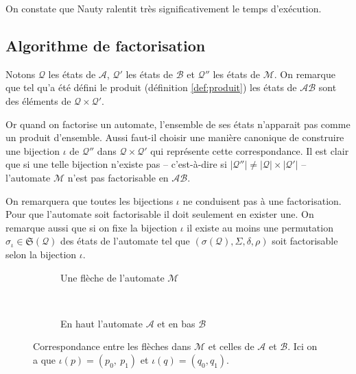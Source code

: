 \documentclass[11pt,a4paper]{article}
\begin{document}
On constate que Nauty ralentit très significativement le temps d'exécution.

\newpage
\subsection{Algorithme de factorisation\label{sec:facto}}

  Notons $\mathcal{Q}$ les états de $\mathcal{A}$, $\mathcal{Q'}$ les états de $\mathcal{B}$ et $\mathcal{Q''}$ les états de $\mathcal{M}$. On remarque que tel qu'a été défini le produit (définition \ref{def:produit}) les états de $\mathcal{AB}$ sont des éléments de $\mathcal{Q}\times\mathcal{Q'}$.

Or quand on factorise un automate, l'ensemble de ses états n'apparait pas comme un produit d'ensemble. Aussi faut-il choisir une manière canonique de construire une bijection $\iota$ de $\mathcal{Q''}$ dans $\mathcal{Q}\times\mathcal{Q'}$ qui représente cette correspondance. Il est clair que si une telle bijection n'existe pas -- c'est-à-dire si $|\mathcal{Q}''| \ne |\mathcal{Q}|\times|\mathcal{Q'}|$ -- l'automate $\mathcal{M}$ n'est pas factorisable en $\mathcal{AB}$.


On remarquera que toutes les bijections $\iota$ ne conduisent pas à une factorisation. Pour que l'automate soit factorisable il doit seulement en exister une. On remarque aussi que si on fixe la bijection $\iota$ il existe au moins une permutation $\sigma_\iota\in\mathfrak{S}(\mathcal{Q})$ des états de l'automate tel que $\left(\sigma(\mathcal{Q}), \Sigma, \delta, \rho\right)$ soit factorisable selon la bijection $\iota$.

\begin{figure}[h!]
  \begin{subfigure}[b]{0.5\textwidth}
    \centering
    \caption{Une flèche de l'automate $\mathcal{M}$}
  \end{subfigure}
  ~
  \begin{subfigure}[b]{0.5\textwidth}
    \centering
    \caption{En haut l'automate $\mathcal{A}$ et en bas $\mathcal{B}$\label{fig:factor-ab}}
  \end{subfigure}
  \caption{Correspondance entre les flèches dans $\mathcal{M}$ et celles de $\mathcal{A}$ et $\mathcal{B}$. Ici on a que $\iota(p) = (p_0,~p_1)$ et $\iota(q)=(q_0, q_1)$\label{fig:facto}.}
\end{figure}
\end{document}

